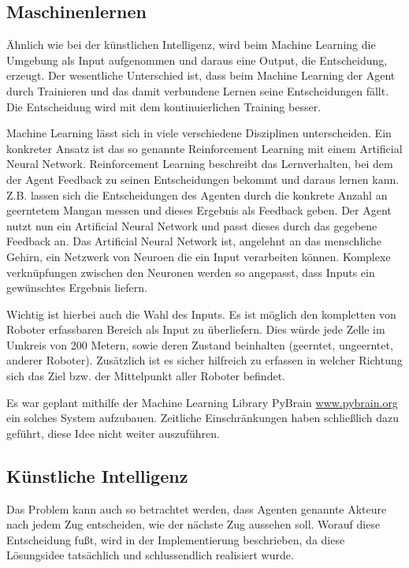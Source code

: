 \documentclass{article}
\begin{document}
\subsection{Maschinenlernen}

Ähnlich wie bei der künstlichen Intelligenz, wird beim Machine Learning die
Umgebung als Input aufgenommen und daraus eine Output, die Entscheidung,
erzeugt. Der wesentliche Unterschied ist, dass beim Machine Learning der Agent
durch Trainieren und das damit verbundene Lernen seine Entscheidungen fällt. Die
Entscheidung wird mit dem kontinuierlichen Training besser.

Machine Learning lässt sich in viele verschiedene Disziplinen unterscheiden. Ein
konkreter Ansatz ist das so genannte Reinforcement Learning mit einem Artificial
Neural Network. Reinforcement Learning beschreibt das Lernverhalten, bei dem der
Agent Feedback zu seinen Entscheidungen bekommt und daraus lernen kann. Z.B.
lassen sich die Entscheidungen des Agenten durch die konkrete Anzahl an
geerntetem Mangan messen und dieses Ergebnis als Feedback geben. Der Agent nutzt
nun ein Artificial Neural Network und passt dieses durch das gegebene Feedback
an. Das Artificial Neural Network ist, angelehnt an das menschliche Gehirn, ein
Netzwerk von Neuroen die ein Input verarbeiten können. Komplexe verknüpfungen
zwischen den Neuronen werden so angepasst, dass Inputs ein gewünschtes Ergebnis
liefern.

Wichtig ist hierbei auch die Wahl des Inputs. Es ist möglich den kompletten von
Roboter erfassbaren Bereich als Input zu überliefern. Dies würde jede Zelle im
Umkreis von 200 Metern, sowie deren Zustand beinhalten (geerntet, ungeerntet,
anderer Roboter). Zusätzlich ist es sicher hilfreich zu erfassen in welcher
Richtung sich das Ziel bzw. der Mittelpunkt aller Roboter befindet.

Es war geplant mithilfe der Machine Learning Library PyBrain \url{www.pybrain.org}
ein solches System aufzubauen. Zeitliche Einschränkungen haben schließlich dazu
geführt, diese Idee nicht weiter auszuführen.

\subsection{Künstliche Intelligenz}

Das Problem kann auch so betrachtet werden, dass Agenten genannte Akteure
nach jedem Zug entscheiden, wie der nächste Zug aussehen soll. Worauf diese Entscheidung
fußt, wird in der Implementierung beschrieben, da diese Lösungsidee tatsächlich
und schlussendlich realisiert wurde.
\end{document}
